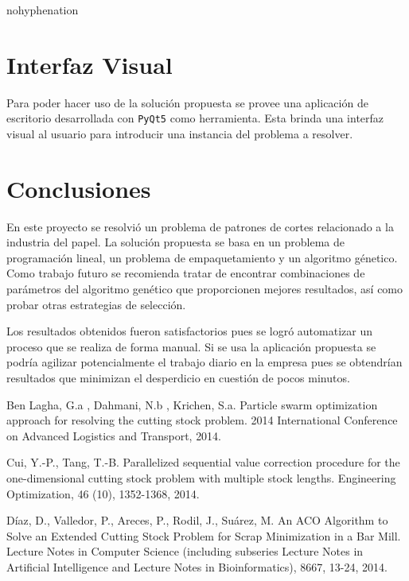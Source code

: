 \documentclass[a4paper,10pt,twocolumn]{article}
\begin{document}
\begin{hyphenrules}{nohyphenation}
\section{Interfaz Visual}\label{visual}
Para poder hacer uso de la solución propuesta se provee una aplicación de escritorio desarrollada con \texttt{PyQt5} como herramienta. Esta brinda una interfaz visual al usuario para introducir una instancia del problema a resolver.

\section{Conclusiones}\label{sec:conc}
En este proyecto se resolvi\'o un problema de patrones de cortes relacionado a la industria del papel. La solución propuesta se basa en un problema de programación lineal, un problema de empaquetamiento y un algoritmo génetico. Como trabajo futuro se recomienda tratar de encontrar combinaciones de par\'ametros del algoritmo gen\'etico que proporcionen mejores resultados, as\'i como probar otras estrategias de selecci\'on.  

 Los resultados obtenidos fueron satisfactorios pues se logr\'o automatizar un proceso que se realiza de forma manual. Si se usa la aplicaci\'on propuesta se podr\'ia agilizar potencialmente el trabajo diario en la empresa pues se obtendr\'ian resultados que minimizan el desperdicio en cuesti\'on de pocos minutos. 



\begin{thebibliography}{99}
	 Ben Lagha, G.a , Dahmani, N.b , Krichen, S.a.
	Particle swarm optimization approach for resolving the
	cutting stock problem. 2014 International Conference
	on Advanced Logistics and Transport, 2014.
	
	  Cui, Y.-P., Tang, T.-B. Parallelized sequential value correction procedure for the one-dimensional cutting
	stock problem with multiple stock lengths. Engineering
	Optimization, 46 (10), 1352-1368, 2014.
	
	  Díaz, D., Valledor, P., Areces, P., Rodil, J., Suárez, M.
	An ACO Algorithm to Solve an Extended Cutting Stock
	Problem for Scrap Minimization in a Bar Mill. Lecture
	Notes in Computer Science (including subseries Lecture
	Notes in Artificial Intelligence and Lecture Notes in
	Bioinformatics), 8667, 13-24, 2014.
	

\end{thebibliography}
\end{hyphenrules}
\end{document}
